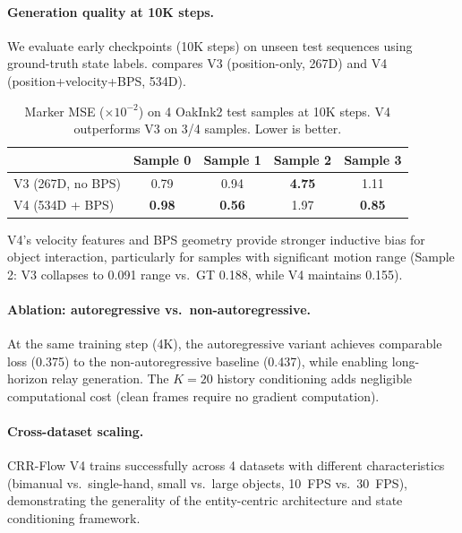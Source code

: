 \paragraph{Generation quality at 10K steps.}
We evaluate early checkpoints (10K steps) on unseen test sequences using ground-truth state labels.  compares V3 (position-only, 267D) and V4 (position+velocity+BPS, 534D).

\begin{table}[t]
  \caption{Marker MSE ($\times 10^{-2}$) on 4 OakInk2 test samples at 10K steps. V4 outperforms V3 on 3/4 samples. Lower is better.}
  \label{tab:gen_quality}
  \begin{tabular}{@{}lcccc@{}}
    \toprule
    & Sample 0 & Sample 1 & Sample 2 & Sample 3 \\
    \midrule
    V3 (267D, no BPS) & 0.79 & 0.94 & \textbf{4.75} & 1.11 \\
    V4 (534D + BPS)   & \textbf{0.98} & \textbf{0.56} & 1.97 & \textbf{0.85} \\
    \bottomrule
  \end{tabular}
\end{table}

V4's velocity features and BPS geometry provide stronger inductive bias for object interaction, particularly for samples with significant motion range (Sample 2: V3 collapses to 0.091 range vs.\ GT 0.188, while V4 maintains 0.155).

\paragraph{Ablation: autoregressive vs.\ non-autoregressive.}
At the same training step (4K), the autoregressive variant achieves comparable loss (0.375) to the non-autoregressive baseline (0.437), while enabling long-horizon relay generation. The $K{=}20$ history conditioning adds negligible computational cost (clean frames require no gradient computation).

\paragraph{Cross-dataset scaling.}
CRR-Flow V4 trains successfully across 4 datasets with different characteristics (bimanual vs.\ single-hand, small vs.\ large objects, 10~FPS vs.\ 30~FPS), demonstrating the generality of the entity-centric architecture and state conditioning framework.

